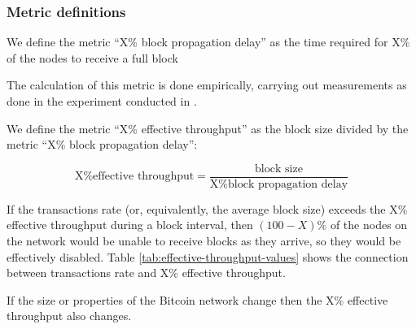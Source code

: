 \subsubsection{Metric definitions}
\begin{definition}
  We define the metric ``X\% block propagation delay'' as the time required for
  X\% of the nodes to receive a full block
\end{definition}
\begin{remark}
  The calculation of this metric is done empirically, carrying out measurements
  as done in the experiment conducted in \cite{croman-scaling-blockchain}.
\end{remark}

\begin{definition}\label{def:effective-throughput}
  We define the metric ``X\% effective throughput'' as the block size divided by
  the metric ``X\% block propagation delay'':

  \[\text{X\% effective throughput} = \frac{\text{block size}}{\text{X\% block
  propagation delay}}\]
\end{definition}

\begin{remark}\label{remark-1}
  If the transactions rate (or, equivalently, the average block size) exceeds
  the X\% effective throughput during a block interval, then $(100-X)\%$
  of the nodes on the network would be unable to receive blocks as they arrive,
  so they would be effectively disabled. Table \ref{tab:effective-throughput-values}
  shows the connection between transactions rate and X\% effective throughput.
\end{remark}

\begin{remark}
  If the size or properties of the Bitcoin network change then the X\% effective
  throughput also changes.
\end{remark}

\begin{table}[h!]
\centering
{}
\caption{Effective throughtputs and associated transactions per second. The values
are calculated assuming that 50\% and 90\% block propagation times are 8.7 seconds
and 79 seconds respectively, while the average block size is 540KB and the
transactions are 250-byte transactions. Note that the effective throughput
values are expressed in kilo-bits per second.}
\label{tab:effective-throughput-values}
\end{table}




